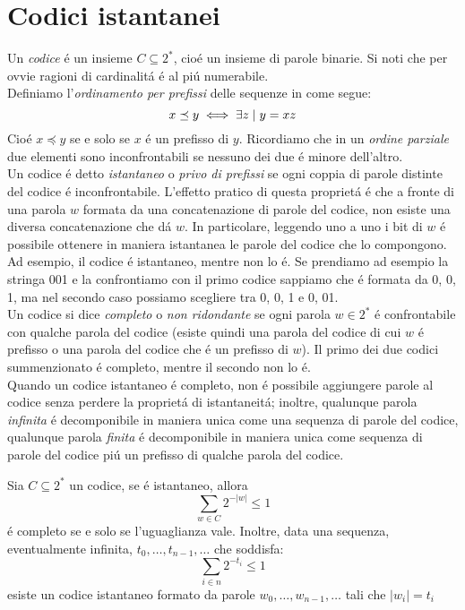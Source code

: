 \section{Codici istantanei}
Un \textit{codice} é un insieme $C \subseteq 2^*$, cioé un insieme di parole binarie. Si noti che per ovvie ragioni di cardinalitá  é al piú numerabile.\\
Definiamo l'\textit{ordinamento per prefissi} delle sequenze in  come segue:
\begin{equation}
    x \preceq y \iff \exists z \hspace{1mm}|\hspace{1mm} y = xz
\end{equation}
Cioé $x \preceq y$ se e solo se $x$ é un prefisso di $y$. Ricordiamo che in un \textit{ordine parziale} due elementi sono inconfrontabili se nessuno dei due é minore dell'altro.\\
Un codice é detto \textit{istantaneo} o \textit{privo di prefissi} se ogni coppia di parole distinte del codice é inconfrontabile. L'effetto pratico di questa proprietá é che a fronte di una parola $w$ formata da una concatenazione di parole del codice, non esiste una diversa concatenazione che dá $w$. In particolare, leggendo uno a uno i bit di $w$ é possibile ottenere in maniera istantanea le parole del codice che lo compongono.\\
Ad esempio, il codice  é istantaneo, mentre  non lo é. Se prendiamo ad esempio la stringa 001 e la confrontiamo con il primo codice sappiamo che é formata da 0, 0, 1, ma nel secondo caso possiamo scegliere tra 0, 0, 1 e 0, 01.\\
Un codice si dice \textit{completo} o \textit{non ridondante} se ogni parola $w \in 2^*$ é confrontabile con qualche parola del codice (esiste quindi una parola del codice di cui $w$ é prefisso o una parola del codice che é un prefisso di $w$). Il primo dei due codici summenzionato é completo, mentre il secondo non lo é.\\
Quando un codice istantaneo é completo, non é possibile aggiungere parole al codice senza perdere la proprietá di istantaneitá; inoltre, qualunque parola \textit{infinita} é decomponibile in maniera unica come una sequenza di parole del codice, qualunque parola \textit{finita} é decomponibile in maniera unica come sequenza di parole del codice piú un prefisso di qualche parola del codice.
\begin{teo}
    Sia $C \subseteq 2^*$ un codice, se  é istantaneo, allora
    \begin{equation*}
        \sum_{w \in C}{2^{-|w|}} \leq 1
    \end{equation*}
     é completo se e solo se l'uguaglianza vale. Inoltre, data una sequenza, eventualmente infinita, $t_0, \dots, t_{n - 1}, \dots$ che soddisfa:
    \begin{equation*}
        \sum_{i \in n}{2^{-t_i}} \leq 1
    \end{equation*}
    esiste un codice istantaneo formato da parole $w_0, \dots, w_{n - 1}, \dots$ tali che $|w_i| = t_i$
\end{teo}
